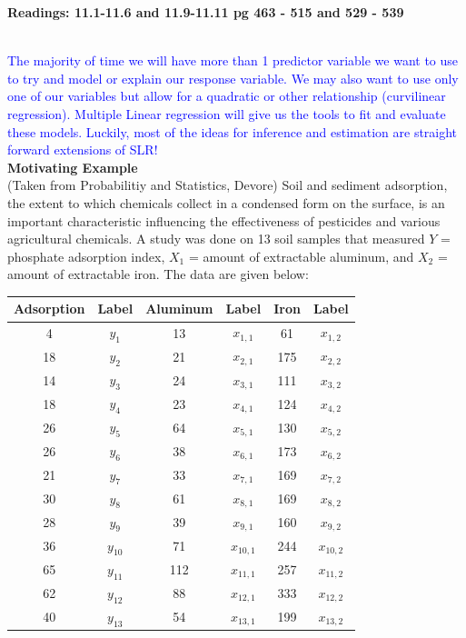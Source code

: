 \begin{center}\large\textbf{Readings: 11.1-11.6 and 11.9-11.11 pg 463 - 515 and 529 - 539}\\
\normalsize \end{center}
\large ~\hrulefill
~\\
\textcolor{blue}{The majority of time we will have more than 1 predictor variable we want to use to try and model or explain our response variable.  We may also want to use only one of our variables but allow for a quadratic or other relationship (curvilinear regression).  Multiple Linear regression will give us the tools to fit and evaluate these models.  Luckily, most of the ideas for inference and estimation are straight forward extensions of SLR!}\\

\textbf{Motivating Example}\\
(Taken from Probabilitiy and Statistics, Devore)  Soil and sediment adsorption, the extent to which chemicals collect in a condensed form on the surface, is an important characteristic influencing the effectiveness of pesticides and various agricultural chemicals.  A study was done on 13 soil samples that measured $Y$ = phosphate adsorption index, $X_1$ = amount of extractable aluminum, and $X_2$ = amount of extractable iron.  The data are given below:
\begin{center}
\begin{tabular}{cc|cc|cc}
Adsorption & Label & Aluminum & Label & Iron & Label\\
\hline
4 &$y_{1}$ &13 &$x_{1,1}$ &61 &$x_{1,2}$\\
18&$y_{2}$ &21 &$x_{2,1}$ &175&$x_{2,2}$\\
14&$y_{3}$ &24 &$x_{3,1}$ &111&$x_{3,2}$\\
18&$y_{4}$ &23 &$x_{4,1}$ &124&$x_{4,2}$\\
26&$y_{5}$ &64 &$x_{5,1}$ &130&$x_{5,2}$\\
26&$y_{6}$ &38 &$x_{6,1}$ &173&$x_{6,2}$\\
21&$y_{7}$ &33 &$x_{7,1}$ &169&$x_{7,2}$\\
30&$y_{8}$ &61 &$x_{8,1}$ &169&$x_{8,2}$\\
28&$y_{9}$ &39 &$x_{9,1}$ &160&$x_{9,2}$\\
36&$y_{10}$&71 &$x_{10,1}$&244&$x_{10,2}$\\
65&$y_{11}$&112&$x_{11,1}$&257&$x_{11,2}$\\
62&$y_{12}$&88 &$x_{12,1}$&333&$x_{12,2}$\\
40&$y_{13}$&54 &$x_{13,1}$&199&$x_{13,2}$\\
\end{tabular}
\end{center}

